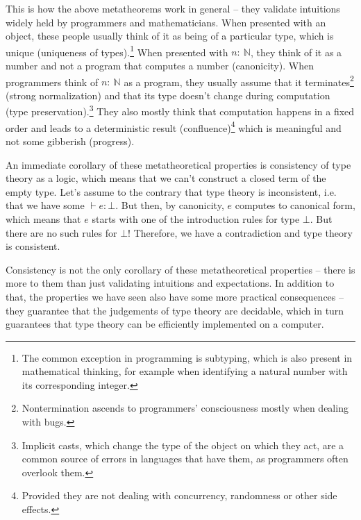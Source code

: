 \documentclass[declaration,mgr,english,shortabstract]{iithesis}
\newcommand{\m}[1]{\texttt{#1}}
\newcommand{\term}[3]{#1 \vdash #2 : #3}
\newcommand{\Empty}{\bot}
\newcommand{\N}{\mathbb{N}}
\begin{document}
This is how the above metatheorems work in general -- they validate intuitions widely held by programmers and mathematicians. When presented with an object, these people usually think of it as being of a particular type, which is unique (uniqueness of types).\footnote{The common exception in programming is subtyping, which is also present in mathematical thinking, for example when identifying a natural number with its corresponding integer.} When presented with $n :\ \N$, they think of it as a number and not a program that computes a number (canonicity). When programmers think of $n :\ \N$ as a program, they usually assume that it terminates\footnote{Nontermination ascends to programmers' consciousness mostly when dealing with bugs.} (strong normalization) and that its type doesn't change during computation (type preservation).\footnote{Implicit casts, which change the type of the object on which they act, are a common source of errors in languages that have them, as programmers often overlook them.} They also mostly think that computation happens in a fixed order and leads to a deterministic result (confluence)\footnote{Provided they are not dealing with concurrency, randomness or other side effects.} which is meaningful and not some gibberish (progress).

An immediate corollary of these metatheoretical properties is consistency of type theory as a logic, which means that we can't construct a closed term of the empty type. Let's assume to the contrary that type theory is inconsistent, i.e. that we have some $\term{}{e}{\Empty}$. But then, by canonicity, $e$ computes to canonical form, which means that $e$ starts with one of the introduction rules for type $\Empty$. But there are no such rules for $\Empty$! Therefore, we have a contradiction and type theory is consistent.


Consistency is not the only corollary of these metatheoretical properties -- there is more to them than just validating intuitions and expectations. In addition to that, the properties we have seen also have some more practical consequences -- they guarantee that the judgements of type theory are decidable, which in turn guarantees that type theory can be efficiently implemented on a computer.
\end{document}
